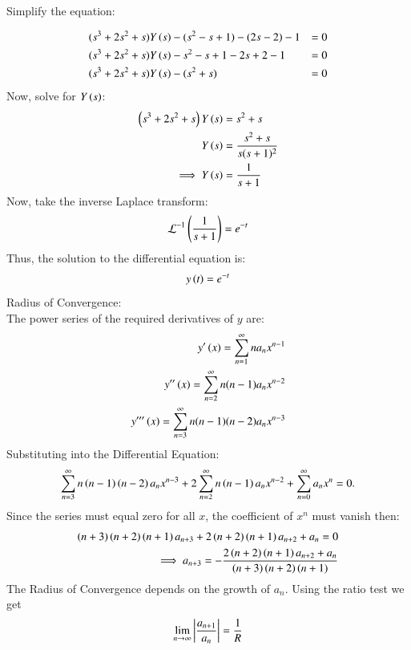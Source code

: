 \documentclass[journal]{IEEEtran}
\begin{document}
Simplify the equation:

\begin{align}
&(s^3 + 2s^2 + s) Y\left(s\right) - (s^2 - s + 1) - (2s - 2) - 1 &= 0 \\
&(s^3 + 2s^2 + s) Y\left(s\right) - s^2 - s + 1 - 2s + 2 - 1 &= 0 \\
&(s^3 + 2s^2 + s) Y\left(s\right) - (s^2 + s) &= 0
\end{align}
Now, solve for \( Y\left(s\right) \):
\begin{align}
\left(s^3 + 2s^2 + s\right) Y\left(s\right) &= s^2 + s \\
Y\left(s\right) &= \frac{s^2 + s}{s(s+1)^2}\\
\implies Y\left(s\right) &= \frac{1}{s + 1}
\end{align}
Now, take the inverse Laplace transform:
\begin{align}
\mathcal{L}^{-1}\left(\frac{1}{s + 1}\right) = e^{-t}
\end{align}
Thus, the solution to the differential equation is:
\begin{align}
   y\left(t\right) = e^{-t} 
\end{align}
\newline
Radius of Convergence:\\
The power series of the required derivatives of $y$ are:
\begin{align}
    y^{\prime}\left(x\right)=\sum_{n=1}^\infty n a_n x^{n-1}\\
    y^{\prime\prime}\left(x\right)=\sum_{n=2}^\infty n(n-1) a_n x^{n-2}\\
    y^{\prime\prime\prime}\left(x\right)=\sum_{n=3}^\infty n(n-1)(n-2) a_n x^{n-3}
\end{align}
Substituting into the Differential Equation:
\begin{align}
    \sum_{n=3}^\infty n\left(n-1\right)\left(n-2\right) a_n x^{n-3} 
+ 2\sum_{n=2}^\infty n\left(n-1\right) a_n x^{n-2} 
+ \sum_{n=0}^\infty a_n x^n = 0.
\end{align}
Since the series must equal zero for all $x$, the coefficient of $x^n$ must vanish then:
\begin{align}
    \left(n+3\right)\left(n+2\right)\left(n+1\right)a_{n+3}+2\left(n+2\right)\left(n+1\right)a_{n+2}+a_n=0\\
    \implies a_{n+3}=-\frac{2\left(n+2\right)\left(n+1\right)a_{n+2}+a_n}{\left(n+3\right)\left(n+2\right)\left(n+1\right)}
\end{align}
The Radius of Convergence depends on the growth of $a_n$. Using the ratio test we get
\begin{align}
    \lim_{n\to\infty}\left\vert\frac{a_{n+1}}{a_n}\right\vert=\frac{1}{R}
\end{align}
\end{document}
